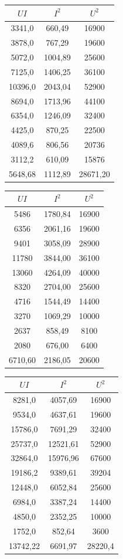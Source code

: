 \documentclass{report}
\begin{document}
		\begin{tabular}{|c|c|c|} 
			\hline
			$UI$ & $I^{2}$ & $U^{2}$ \\
			\hline
			3341,0  & 660,49   & 16900 \\
			3878,0  & 767,29   & 19600 \\
			5072,0  & 1004,89  & 25600 \\
			7125,0  & 1406,25  & 36100 \\
			10396,0 & 2043,04  & 52900 \\
			8694,0  & 1713,96  & 44100 \\
			6354,0  & 1246,09  & 32400 \\
			4425,0  & 870,25   & 22500 \\
			4089,6  & 806,56   & 20736 \\
			3112,2  & 610,09   & 15876 \\
			\hline
			5648,68  & 1112,89  & 28671,20 \\
			\hline
		\end{tabular}
		\begin{tabular}{|c|c|c|}
			\hline
			$UI$ & $I^{2}$ & $U^{2}$ \\
			\hline
			5486  & 1780,84  & 16900 \\
			6356  & 2061,16  & 19600 \\
			9401  & 3058,09  & 28900 \\
			11780 & 3844,00  & 36100 \\
			13060 & 4264,09  & 40000 \\
			8320  & 2704,00  & 25600 \\
			4716  & 1544,49  & 14400 \\
			3270  & 1069,29  & 10000 \\
			2637  & 858,49   & 8100 \\
			2080  & 676,00   & 6400 \\
			\hline
			6710,60  & 2186,05  & 20600  \\
			\hline
		\end{tabular}
		\begin{tabular}{|c|c|c|}
			\hline
			$UI$ & $I^{2}$ & $U^{2}$ \\
			\hline
			8281,0  & 4057,69  & 16900 \\
			9534,0  & 4637,61  & 19600 \\
			15786,0 & 7691,29  & 32400 \\
			25737,0 & 12521,61 & 52900 \\
			32864,0 & 15976,96 & 67600 \\
			19186,2 & 9389,61  & 39204 \\
			12448,0 & 6052,84  & 25600 \\
			6984,0  & 3387,24  & 14400 \\
			4850,0 & 2352,25  & 10000 \\
			1752,0  & 852,64   & 3600\\
			\hline
			13742,22 & 6691,97  & 28220,4 \\
			\hline
		\end{tabular}
		\\
	
\end{document}
